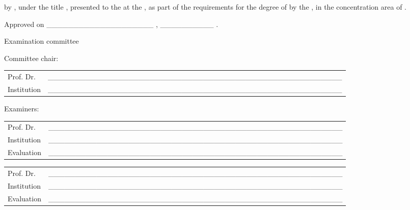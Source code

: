 \begin{folhadeaprovacao}[\folhadeaprovacaoname]
{\imprimirtipotrabalho} by {\imprimirautor}, under the title \textbf{\imprimirtitulo}, presented to the {\imprimirescola} at the {\imprimiruniversidade}, as part of the requirements for the degree of {\imprimirtituloacademico} by the {\imprimirprograma}, in the concentration area of {\imprimirareadeconcentracao}.
\vspace{1.5cm}

Approved on \_\_\_\_\_\_\_\_\_\_\_\_\_\_\_\_\_\_\_\_ , \_\_\_\_\_\_\_\_\_\_ .
\vspace{1.5cm}

\begin{center}
  Examination committee
\end{center}
\vspace{0.5cm}

Committee chair:
\vspace{0.25cm}

\renewcommand{\arraystretch}{2}
\setlength{\arrayrulewidth}{0pt}
\setlength{\tabcolsep}{0cm}
\begin{tabular}{m{2cm} P{14cm}}
  Prof. Dr. & \_\_\_\_\_\_\_\_\_\_\_\_\_\_\_\_\_\_\_\_\_\_\_\_\_\_\_\_\_\_\_\_\_\_\_\_\_\_\_\_\_\_\_\_\_\_\_\_\_\_\_\_\_\_\_ \\
  Institution & \_\_\_\_\_\_\_\_\_\_\_\_\_\_\_\_\_\_\_\_\_\_\_\_\_\_\_\_\_\_\_\_\_\_\_\_\_\_\_\_\_\_\_\_\_\_\_\_\_\_\_\_\_\_\_ \\
\end{tabular}
\vspace{1cm}

Examiners:
\vspace{0.25cm}

\begin{tabular}{m{2cm} P{14cm}}
  Prof. Dr. & \_\_\_\_\_\_\_\_\_\_\_\_\_\_\_\_\_\_\_\_\_\_\_\_\_\_\_\_\_\_\_\_\_\_\_\_\_\_\_\_\_\_\_\_\_\_\_\_\_\_\_\_\_\_\_ \\
  Institution & \_\_\_\_\_\_\_\_\_\_\_\_\_\_\_\_\_\_\_\_\_\_\_\_\_\_\_\_\_\_\_\_\_\_\_\_\_\_\_\_\_\_\_\_\_\_\_\_\_\_\_\_\_\_\_ \\
  Evaluation & \_\_\_\_\_\_\_\_\_\_\_\_\_\_\_\_\_\_\_\_\_\_\_\_\_\_\_\_\_\_\_\_\_\_\_\_\_\_\_\_\_\_\_\_\_\_\_\_\_\_\_\_\_\_\_ \\
\end{tabular}
\vspace{0.5cm}

\begin{tabular}{m{2cm} P{14cm}}
  Prof. Dr. & \_\_\_\_\_\_\_\_\_\_\_\_\_\_\_\_\_\_\_\_\_\_\_\_\_\_\_\_\_\_\_\_\_\_\_\_\_\_\_\_\_\_\_\_\_\_\_\_\_\_\_\_\_\_\_ \\
  Institution & \_\_\_\_\_\_\_\_\_\_\_\_\_\_\_\_\_\_\_\_\_\_\_\_\_\_\_\_\_\_\_\_\_\_\_\_\_\_\_\_\_\_\_\_\_\_\_\_\_\_\_\_\_\_\_ \\
  Evaluation & \_\_\_\_\_\_\_\_\_\_\_\_\_\_\_\_\_\_\_\_\_\_\_\_\_\_\_\_\_\_\_\_\_\_\_\_\_\_\_\_\_\_\_\_\_\_\_\_\_\_\_\_\_\_\_ \\
\end{tabular}
\vspace{0.5cm}


\end{folhadeaprovacao}

